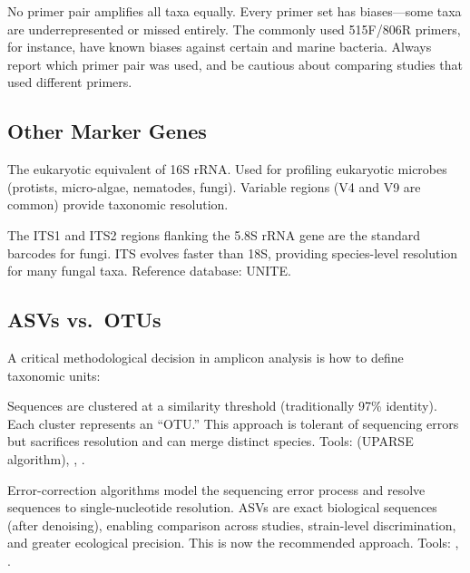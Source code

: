 \begin{warningbox}[title={Primer Bias}]
No primer pair amplifies all taxa equally. Every primer set has biases---some taxa are underrepresented or missed entirely. The commonly used 515F/806R primers, for instance, have known biases against certain  and  marine bacteria. Always report which primer pair was used, and be cautious about comparing studies that used different primers.
\end{warningbox}

\subsection{Other Marker Genes}

\begin{description}[style=nextline]
  \item[18S rRNA] The eukaryotic equivalent of 16S rRNA. Used for profiling eukaryotic microbes (protists, micro-algae, nematodes, fungi). Variable regions (V4 and V9 are common) provide taxonomic resolution.
  \item[ITS (Internal Transcribed Spacer)] The ITS1 and ITS2 regions flanking the 5.8S rRNA gene are the standard barcodes for fungi. ITS evolves faster than 18S, providing species-level resolution for many fungal taxa. Reference database: UNITE.
\end{description}

\subsection{ASVs vs.\ OTUs}

A critical methodological decision in amplicon analysis is how to define taxonomic units:

\begin{description}[style=nextline]
  \item[OTU (Operational Taxonomic Unit)] Sequences are clustered at a similarity threshold (traditionally 97\% identity). Each cluster represents an ``OTU.'' This approach is tolerant of sequencing errors but sacrifices resolution and can merge distinct species. Tools:  (UPARSE algorithm), , .
  \item[ASV (Amplicon Sequence Variant)] Error-correction algorithms model the sequencing error process and resolve sequences to single-nucleotide resolution. ASVs are exact biological sequences (after denoising), enabling comparison across studies, strain-level discrimination, and greater ecological precision. This is now the recommended approach. Tools: , .
\end{description}

